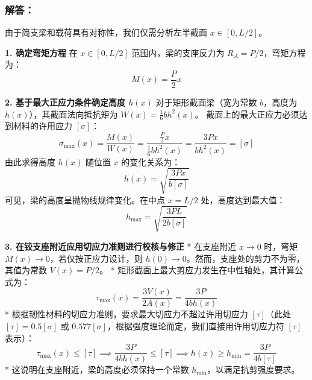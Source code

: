 \documentclass[UTF8,fontset=windows]{ctexart}
\begin{document}
\begin{center}
\end{center}

\subsubsection*{解答：}

由于简支梁和载荷具有对称性，我们仅需分析左半截面 $x \in [0, L/2]$。

\textbf{1. 确定弯矩方程}
在 $x \in [0, L/2]$ 范围内，梁的支座反力为 $R_A = P/2$，弯矩方程为：
\[
    M(x) = \frac{P}{2} x
\]

\textbf{2. 基于最大正应力条件确定高度 $h(x)$}
对于矩形截面梁（宽为常数 $b$，高度为 $h(x)$），其截面法向抵抗矩为 $W(x) = \frac{1}{6} b h^2(x)$。
截面上的最大正应力必须达到材料的许用应力 $[\sigma]$：
\[
    \sigma_{\max}(x) = \frac{M(x)}{W(x)} = \frac{\frac{P}{2} x}{\frac{1}{6} b h^2(x)} = \frac{3 P x}{b h^2(x)} = [\sigma]
\]
由此求得高度 $h(x)$ 随位置 $x$ 的变化关系为：
\[
    h(x) = \sqrt{\frac{3 P x}{b [\sigma]}}
\]
可见，梁的高度呈抛物线规律变化。在中点 $x = L/2$ 处，高度达到最大值：
\[
    h_{\max} = \sqrt{\frac{3 P L}{2 b [\sigma]}}
\]

\textbf{3. 在铰支座附近应用切应力准则进行校核与修正}
*   在支座附近 $x \to 0$ 时，弯矩 $M(x) \to 0$，若仅按正应力设计，则 $h(0) \to 0$。然而，支座处的剪力不为零，其值为常数 $V(x) = P/2$。
*   矩形截面上最大剪应力发生在中性轴处，其计算公式为：
    \[
        \tau_{\max}(x) = \frac{3 V(x)}{2 A(x)} = \frac{3 P}{4 b h(x)}
    \]
*   根据韧性材料的切应力准则，要求最大切应力不超过许用切应力 $[\tau]$（此处 $[\tau] = 0.5 [\sigma]$ 或 $0.577 [\sigma]$，根据强度理论而定，我们直接用许用切应力符 $[ \tau ]$ 表示）：
    \[
        \tau_{\max}(x) \le [\tau] \implies \frac{3 P}{4 b h(x)} \le [\tau] \implies h(x) \ge h_{\min} = \frac{3 P}{4 b [\tau]}
    \]
*   这说明在支座附近，梁的高度必须保持一个常数 $h_{\min}$，以满足抗剪强度要求。
\end{document}
